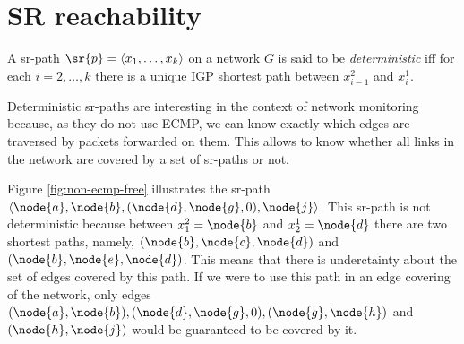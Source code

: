 
\section{SR reachability}

\begin{definition}
A sr-path $\sr{p} = \langle x_1, \ldots, x_k \rangle$ on a network $G$ is said to be \emph{deterministic}
iff for each $i = 2, \ldots, k$ there is a unique IGP shortest path between $x^2_{i - 1}$ and $x^1_i$.
\end{definition}

Deterministic sr-paths are interesting in the context of network monitoring because, as they do not use ECMP,
we can know exactly which edges are traversed by packets forwarded on them. This allows to know whether
all links in the network are covered by a set of sr-paths or not.

Figure \ref{fig:non-ecmp-free} illustrates the sr-path $\langle \node{a}, \node{b}, (\node{d}, \node{g}, 0), \node{j} \rangle$.
This sr-path is not deterministic because between $x^2_1 = \node{b}$ and $x^1_2 = \node{d}$ there are two shortest paths, namely,
$(\node{b}, \node{c}, \node{d})$ and $(\node{b}, \node{e}, \node{d})$. This means that there is underctainty about the set of 
edges covered by this path. If we were to use this path in an edge
covering of the network, only edges $(\node{a}, \node{b}), (\node{d}, \node{g}, 0), (\node{g}, \node{h})$ and $(\node{h}, \node{j})$
would be guaranteed to be covered by it.

